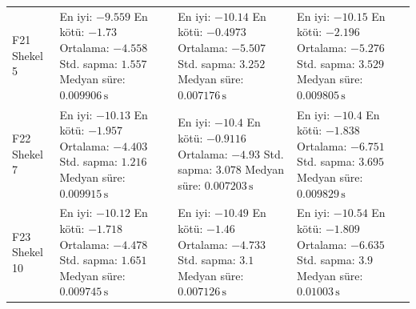\begin{longtable}{@{}p{2.25cm}p{4.25cm}p{4.25cm}p{4.25cm}@{}}
F21 Shekel 5 & \makecell[l]{En iyi: $-9.559$\\ En kötü: $-1.73$\\ Ortalama: $-4.558$\\ Std. sapma: $1.557$\\ Medyan süre: $0.009906\,\mathrm{s}$} & \makecell[l]{En iyi: $-10.14$\\ En kötü: $-0.4973$\\ Ortalama: $-5.507$\\ Std. sapma: $3.252$\\ Medyan süre: $0.007176\,\mathrm{s}$} & \makecell[l]{En iyi: $-10.15$\\ En kötü: $-2.196$\\ Ortalama: $-5.276$\\ Std. sapma: $3.529$\\ Medyan süre: $0.009805\,\mathrm{s}$} \\
F22 Shekel 7 & \makecell[l]{En iyi: $-10.13$\\ En kötü: $-1.957$\\ Ortalama: $-4.403$\\ Std. sapma: $1.216$\\ Medyan süre: $0.009915\,\mathrm{s}$} & \makecell[l]{En iyi: $-10.4$\\ En kötü: $-0.9116$\\ Ortalama: $-4.93$\\ Std. sapma: $3.078$\\ Medyan süre: $0.007203\,\mathrm{s}$} & \makecell[l]{En iyi: $-10.4$\\ En kötü: $-1.838$\\ Ortalama: $-6.751$\\ Std. sapma: $3.695$\\ Medyan süre: $0.009829\,\mathrm{s}$} \\
F23 Shekel 10 & \makecell[l]{En iyi: $-10.12$\\ En kötü: $-1.718$\\ Ortalama: $-4.478$\\ Std. sapma: $1.651$\\ Medyan süre: $0.009745\,\mathrm{s}$} & \makecell[l]{En iyi: $-10.49$\\ En kötü: $-1.46$\\ Ortalama: $-4.733$\\ Std. sapma: $3.1$\\ Medyan süre: $0.007126\,\mathrm{s}$} & \makecell[l]{En iyi: $-10.54$\\ En kötü: $-1.809$\\ Ortalama: $-6.635$\\ Std. sapma: $3.9$\\ Medyan süre: $0.01003\,\mathrm{s}$} \\
\end{longtable}
\endgroup
